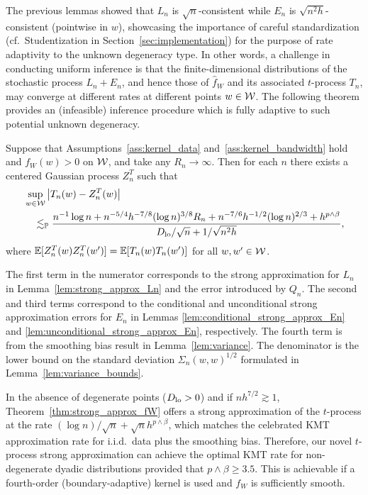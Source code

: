The previous lemmas showed that $L_n$ is
$\sqrt{n}$-consistent while $E_n$ is $\sqrt{n^2h}$-consistent
(pointwise in $w$),
showcasing the importance of careful standardization
(cf.\ Studentization in Section~\ref{sec:implementation})
for the purpose of rate
adaptivity to the unknown degeneracy type.
In other
words, a challenge in conducting uniform inference is that the
finite-dimensional distributions of the stochastic process $L_n+E_n$,
and hence those of $\hat{f}_W$ and its associated $t$-process $T_n$,
may converge at different rates at different points $w\in\mathcal{W}$.
The following theorem provides an
(infeasible)
inference procedure which is fully adaptive to
such potential unknown degeneracy.

\begin{theorem}
  \label{thm:strong_approx_fW}

  Suppose that Assumptions~\ref{ass:kernel_data}
  and~\ref{ass:kernel_bandwidth} hold and
  $f_W(w) > 0$ on $\mathcal{W}$, and take any $R_n \to \infty$.
  Then for each $n$ there exists a
  centered Gaussian process $Z_n^{T}$ such that
  \begin{align*}
    &\sup_{w \in \mathcal{W}}
    \left|
    T_n(w)
    -
    Z_n^{T}(w)
    \right| \\
    &\quad\lesssim_{\mathbb{P}}
    \frac{
      n^{-1} \log n
      + n^{-5/4} h^{-7/8} (\log n)^{3/8} R_n
      + n^{-7/6} h^{-1/2} (\log n)^{2/3}
    + h^{p\wedge\beta}}
    {D_{\textup{lo}}/\sqrt{n} + 1/\sqrt{n^2h}},
  \end{align*}
  where $\mathbb{E}[Z_n^T(w)Z_n^T(w')] = \mathbb{E}[T_n(w)T_n(w')]$
  for all $w,w' \in \mathcal{W}$.
\end{theorem}

The first term in the numerator corresponds to
the strong approximation for $L_n$ in Lemma~\ref{lem:strong_approx_Ln}
and the error introduced by $Q_n$.
The second and third terms correspond to the conditional
and unconditional strong approximation errors for
$E_n$ in Lemmas \ref{lem:conditional_strong_approx_En}
and \ref{lem:unconditional_strong_approx_En}, respectively.
The fourth term is from the smoothing bias result
in Lemma~\ref{lem:variance}.
The denominator is the lower bound on the standard
deviation $\Sigma_n(w,w)^{1/2}$
formulated in Lemma~\ref{lem:variance_bounds}.

In the absence of degenerate points ($D_{\textup{lo}} > 0$) and if
$n h^{7/2}\gtrsim 1$, Theorem~\ref{thm:strong_approx_fW}
offers a strong approximation of the $t$-process at the rate
$(\log n)/\sqrt{n}+\sqrt{n}h^{p\wedge\beta}$, which matches the celebrated KMT
approximation rate for i.i.d.\ data plus the
smoothing bias.
Therefore, our novel $t$-process strong
approximation can achieve the optimal KMT rate for
non-degenerate dyadic
distributions provided that $p\wedge\beta \geq 3.5$.
This is achievable
if a fourth-order (boundary-adaptive) kernel is used
and $f_W$ is sufficiently smooth.


